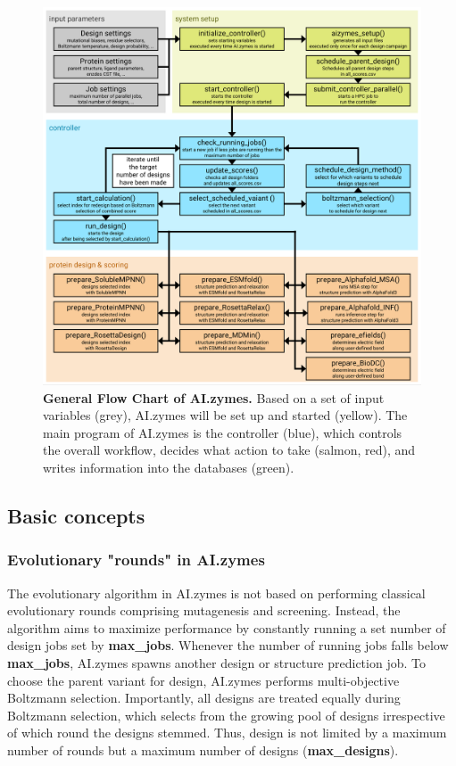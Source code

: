\documentclass[10pt]{extarticle}
\begin{document}
\begin{figure}[htbp]
\centering
\includegraphics[width=16cm]{images/Figure1_AIzymes_Sheme.pdf}
\caption{\textbf{General Flow Chart of AI.zymes.} Based on a set of input variables (grey), AI.zymes will be set up and started (yellow). The main program of AI.zymes is the controller (blue), which controls the overall workflow, decides what action to take (salmon, red), and writes information into the databases (green).}
\end{figure}

\subsection{Basic concepts}

\subsubsection{Evolutionary "rounds" in AI.zymes}

The evolutionary algorithm in AI.zymes is not based on performing classical evolutionary rounds comprising mutagenesis and screening. Instead, the algorithm aims to maximize performance by constantly running a set number of design jobs set by \textbf{max\_jobs}. Whenever the number of running jobs falls below \textbf{max\_jobs}, AI.zymes spawns another design or structure prediction job. To choose the parent variant for design, AI.zymes performs multi-objective Boltzmann selection. Importantly, all designs are treated equally during Boltzmann selection, which selects from the growing pool of designs irrespective of which round the designs stemmed. Thus, design is not limited by a maximum number of rounds but a maximum number of designs (\textbf{max\_designs}).
\end{document}
